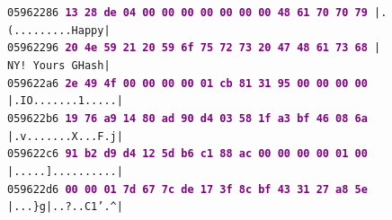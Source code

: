 \documentclass{article}
\begin{document}
\begin{figure}[H]
{    \texttt{05962286  \textbf{\textcolor{purple}{13 28 de 04 00 00 00 00  00 00 00 48 61 70 70 79}}  |.(.........Happy|} \\
    \texttt{05962296  \textbf{\textcolor{purple}{20 4e 59 21 20 59 6f 75  72 73 20 47 48 61 73 68}}  | NY! Yours GHash|} \\
    \texttt{059622a6  \textbf{\textcolor{purple}{2e 49 4f 00 00 00 00 01  cb 81 31 95 00 00 00 00}}  |.IO.......1.....|} \\
    \texttt{059622b6  \textbf{\textcolor{purple}{19 76 a9 14 80 ad 90 d4  03 58 1f a3 bf 46 08 6a}}  |.v.......X...F.j|} \\
    \texttt{059622c6  \textbf{\textcolor{purple}{91 b2 d9 d4 12 5d b6 c1  88 ac 00 00 00 00 01 00}}  |.....]..........|} \\
    \texttt{059622d6  \textbf{\textcolor{purple}{00 00 01 7d 67 7c de 17  3f 8c bf 43 31 27 a8 5e}}  |...\}g|..?..C1'.\textasciicircum|}
    }
    \end{figure}
\end{document}
